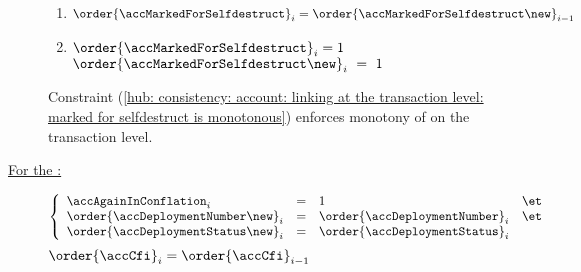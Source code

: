 \begin{description}
\begin{enumerate}
			\item $\order{\accMarkedForSelfdestruct}_{i} = \order{\accMarkedForSelfdestruct\new}_{i - 1} $
			\item \label{hub: consistency: account: linking at the transaction level: marked for selfdestruct is monotonous} \If $\order{\accMarkedForSelfdestruct}_{i} = 1$ \Then $\order{\accMarkedForSelfdestruct\new}_{i}~=~1$
		\end{enumerate}
		\saNote{}
		Constraint (\ref{hub: consistency: account: linking at the transaction level: marked for selfdestruct is monotonous})
		enforces monotony of \accMarkedForSelfdestruct{} on the transaction level.
	\item[\underline{For the \CFI{}:}]
		\If
		\[
			\left\{ \begin{array}{lclc}
				\accAgainInConflation_{i}             & = & 1                                & \et \\
				\order{\accDeploymentNumber \new}_{i} & = & \order{\accDeploymentNumber}_{i} & \et \\
				\order{\accDeploymentStatus \new}_{i} & = & \order{\accDeploymentStatus}_{i} \\
			\end{array} \right.
		\]
		\Then $\order{\accCfi} _{i} = \order{\accCfi} _{i - 1}$
\end{description}
